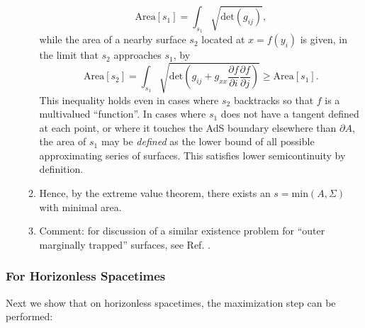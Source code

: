 \documentclass{article}
\begin{document}
\begin{enumerate}[resume]
\begin{enumerate}
\begin{equation}
\mathrm{Area}[s_1] = \int_{s_1} \sqrt{\mathrm{det}(g_{ij})},
\end{equation}
while the area of a nearby surface $s_2$ located at $x = f(y_i)$ is given, in the limit that $s_2$ approaches $s_1$, by
\begin{equation}\label{s_2}
\mathrm{Area}[s_2] = \int_{s_1} \sqrt{ \mathrm{det} 
\left( g_{ij} + g_{xx} \frac{\partial f}{\partial i}\frac{\partial f}{\partial j} \right) } \ge \mathrm{Area}[s_1].
\end{equation}
This inequality holds even in cases where $s_2$ backtracks so that $f$ is a multivalued ``function''.  
In cases where $s_1$ does not have a tangent defined at each point, or where it touches the AdS boundary elsewhere than $\partial A$, the area of $s_1$ may be \emph{defined} as the lower bound of all possible approximating series of surfaces.  This satisfies lower semicontinuity by definition.
	\item Hence, by the extreme value theorem, there exists an $s = \mathrm{min}(A,\Sigma)$ with minimal area.
	\item Comment: for discussion of a similar existence problem for ``outer marginally trapped'' surfaces, see Ref. \cite{plat}.
	\end{enumerate}
\end{enumerate}

\subsubsection{For Horizonless Spacetimes}\label{hless}

Next we show that on horizonless spacetimes, the maximization step can be performed:
\end{document}
